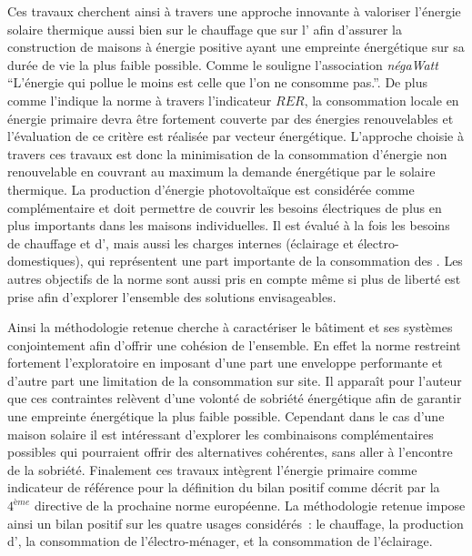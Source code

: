 Ces travaux cherchent ainsi à travers une approche innovante à valoriser l’énergie
solaire thermique aussi bien sur le chauffage que sur l’ afin d’assurer
la construction de maisons à énergie positive ayant une empreinte énergétique sur
sa durée de vie la plus faible possible. Comme le souligne l’association \textit{négaWatt}
\enquote{L’énergie qui pollue le moins est celle que l’on ne consomme pas.}.
De plus comme l’indique la norme  à travers l’indicateur $RER$,
la consommation locale en énergie primaire devra être fortement couverte
par des énergies renouvelables et l’évaluation de ce critère est réalisée par vecteur énergétique.
L’approche choisie à travers ces travaux est donc la minimisation de la consommation
d’énergie non renouvelable en couvrant au maximum la demande énergétique par le solaire
thermique. La production d’énergie photovoltaïque
est considérée comme complémentaire et doit permettre de couvrir les besoins électriques
de plus en plus importants dans les maisons individuelles.
Il est évalué à la fois les besoins de chauffage et d’, mais aussi les charges internes
(éclairage et électro-domestiques), qui représentent une part importante de la consommation des .
Les autres objectifs de la norme  sont aussi pris en compte
même si plus de liberté est prise afin d’explorer l’ensemble des solutions envisageables.

Ainsi la méthodologie retenue cherche à caractériser le bâtiment et ses systèmes conjointement
afin d’offrir une cohésion de l’ensemble. En effet la norme restreint fortement l’exploratoire
en imposant d’une part une enveloppe performante et d’autre part une limitation de la
consommation sur site. Il apparaît pour l’auteur que ces contraintes relèvent
d’une volonté de sobriété énergétique afin de garantir une empreinte énergétique
la plus faible possible. Cependant dans le cas d’une maison solaire il est intéressant
d’explorer les combinaisons complémentaires possibles qui pourraient offrir des alternatives
cohérentes, sans aller à l’encontre de la sobriété.
Finalement ces travaux intègrent l’énergie primaire comme indicateur de référence
pour la définition du bilan positif comme décrit par la $4^{ème}$ directive de la
prochaine norme européenne. La méthodologie retenue impose ainsi un bilan positif
sur les quatre usages considérés~: le chauffage, la production d’, la
consommation de l’électro-ménager, et la consommation de l’éclairage.

